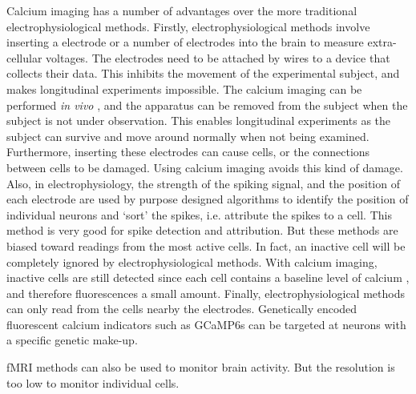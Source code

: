 \documentclass[a4paper,12pt]{article}
\theoremstyle{definition}
\begin{document}
Calcium imaging has a number of advantages over the more traditional electrophysiological methods. Firstly, electrophysiological methods involve inserting a electrode or a number of electrodes into the brain to measure extra-cellular voltages. The electrodes need to be attached by wires to a device that collects their data. This inhibits the movement of the experimental subject, and makes longitudinal experiments impossible. The calcium imaging can be performed \textit{in vivo} \cite{stosiek}, and the apparatus can be removed from the subject when the subject is not under observation. This enables longitudinal experiments as the subject can survive and move around normally when not being examined. Furthermore, inserting these electrodes can cause cells, or the connections between cells to be damaged. Using calcium imaging avoids this kind of damage. Also, in electrophysiology, the strength of the spiking signal, and the position of each electrode are used by purpose designed algorithms to identify the position of individual neurons and ‘sort’ the spikes, i.e. attribute the spikes to a cell. This method is very good for spike detection and attribution. But these methods are biased toward readings from the most active cells. In fact, an inactive cell will be completely ignored by electrophysiological methods. With calcium imaging, inactive cells are still detected since each cell contains a baseline level of calcium \cite{maravall}, and therefore fluorescences a small amount. Finally, electrophysiological methods can only read from the cells nearby the electrodes. Genetically encoded fluorescent calcium indicators such as GCaMP6s can be targeted at neurons with a specific genetic make-up.

fMRI methods can also be used to monitor brain activity. But the resolution is too low to monitor individual cells.
\end{document}
